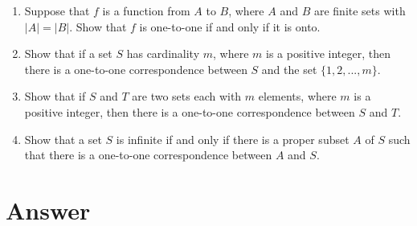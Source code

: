 \documentclass{sig-alternate-05-2015}
\begin{document}
\begin{enumerate}
\item Suppose that $f$ is a function from $A$ to $B$, where $A$ and $B$
are finite sets with $|A| = |B|$. Show that $f$ is one-to-one
if and only if it is onto.

\item Show that if a set $S$ has cardinality $m$, where $m$ is a
positive integer, then there is a one-to-one correspondence
between $S$ and the set $\{1, 2, . . . , m\}$.

\item Show that if $S$ and $T$ are two sets each with $m$ elements,
where $m$ is a positive integer, then there is a
one-to-one correspondence between $S$ and $T$.

\item Show that a set $S$ is infinite if and only if there is a proper
subset $A$ of $S$ such that there is a one-to-one correspondence
between $A$ and $S$.
\end{enumerate}



 
\newpage
\appendix
\section{Answer}
\end{document}
